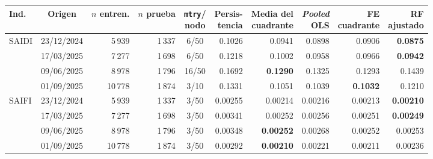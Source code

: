 \begin{tabular}{l c r r c r r r r r}
\toprule
\textbf{Ind.} & \textbf{Origen} & \makecell[c]{$n$\\entren.} & \makecell[c]{$n$\\prueba} & \makecell[c]{\texttt{mtry}/\\nodo} & \makecell[c]{Persis-\\tencia} & \makecell[c]{Media del\\cuadrante} & \makecell[c]{\emph{Pooled}\\OLS} & \makecell[c]{FE\\cuadrante} & \makecell[c]{RF\\ajustado} \\
\midrule
SAIDI & 23/12/2024 & 5\,939 & 1\,337 & 6/50 & 0.1026 & 0.0941 & 0.0898 & 0.0906 & \textbf{0.0875} \\
 & 17/03/2025 & 7\,277 & 1\,698 & 6/50 & 0.1218 & 0.1002 & 0.0958 & 0.0966 & \textbf{0.0942} \\
 & 09/06/2025 & 8\,978 & 1\,796 & 16/50 & 0.1692 & \textbf{0.1290} & 0.1325 & 0.1293 & 0.1439 \\
 & 01/09/2025 & 10\,778 & 1\,874 & 3/10 & 0.1331 & 0.1051 & 0.1039 & \textbf{0.1032} & 0.1210 \\
SAIFI & 23/12/2024 & 5\,939 & 1\,337 & 3/50 & 0.00255 & 0.00214 & 0.00216 & 0.00213 & \textbf{0.00210} \\
 & 17/03/2025 & 7\,277 & 1\,698 & 3/50 & 0.00341 & 0.00252 & 0.00256 & 0.00251 & \textbf{0.00249} \\
 & 09/06/2025 & 8\,978 & 1\,796 & 3/50 & 0.00348 & \textbf{0.00252} & 0.00268 & 0.00252 & 0.00253 \\
 & 01/09/2025 & 10\,778 & 1\,874 & 3/50 & 0.00292 & \textbf{0.00210} & 0.00221 & 0.00211 & 0.00236 \\
\bottomrule
\end{tabular}

